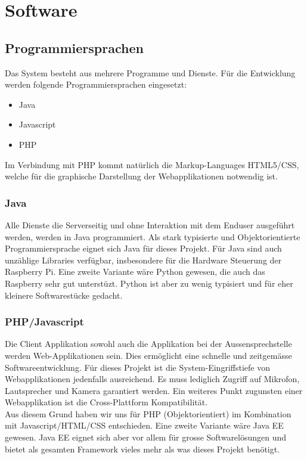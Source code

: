 \section{Software}
\label{sec:chapterexample}

\subsection{Programmiersprachen}
Das System besteht aus mehrere Programme und Dienste. Für die Entwicklung werden folgende Programmiersprachen eingesetzt:
\begin{itemize}
	\item Java
	\item Javascript
	\item PHP
\end{itemize}
Im Verbindung mit PHP kommt natürlich die Markup-Languages HTML5/CSS, welche für die graphische Darstellung der Webapplikationen notwendig ist.

\subsubsection{Java}
\label{kap:java}
Alle Dienste die Serverseitig und ohne Interaktion mit dem Enduser ausgeführt werden, werden in Java programmiert. Als stark typisierte und Objektorientierte Programmiersprache eignet sich Java für dieses Projekt. Für Java sind auch unzählige Libraries verfügbar, insbesondere für die Hardware Steuerung der Raspberry Pi. Eine zweite Variante wäre Python gewesen, die auch das Raspberry sehr gut unterstüzt. Python ist aber zu wenig typisiert und für eher kleinere Softwarestücke gedacht.

\subsubsection{PHP/Javascript}
Die Client Applikation sowohl auch die Applikation bei der Aussensprechstelle werden Web-Applikationen sein. Dies ermöglicht eine schnelle und zeitgemässe Softwareentwicklung. Für dieses Projekt ist die System-Eingriffstiefe von Webapplikationen jedenfalls ausreichend. Es muss lediglich Zugriff auf Mikrofon, Lautsprecher und Kamera garantiert werden. Ein weiteres Punkt zugunsten einer Webapplikation ist die Cross-Plattform Kompatibilität. 
\\
Aus diesem Grund haben wir uns für PHP (Objektorientiert) im Kombination mit Javascript/HTML/CSS entschieden. Eine zweite Variante wäre Java EE gewesen. Java EE eignet sich aber vor allem für grosse Softwarelösungen und bietet als gesamten Framework vieles mehr als was dieses Projekt benötigt. 
\\
